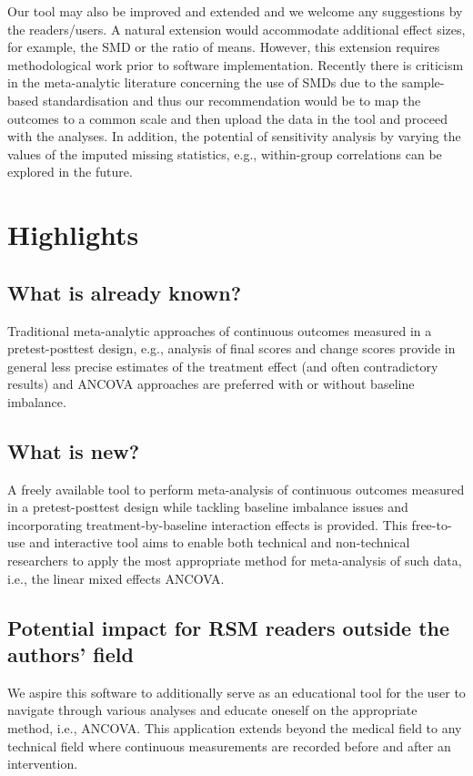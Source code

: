 \documentclass[AMA,STIX1COL]{WileyNJD-v2}
\begin{document}
Our tool may also be improved and extended and we welcome any suggestions by the readers/users. A natural extension would accommodate additional effect sizes, for example, the SMD or the ratio of means. However, this extension requires methodological work prior to software implementation. {\color{blue} Recently there is criticism in the meta-analytic literature concerning the use of SMDs due to the sample-based standardisation \cite{daly2021nice, cuijpers2017pre, kraft2020interpreting, cuijpers2021has} and thus our recommendation would be to map the outcomes to a common scale and then upload the data in the tool and proceed with the analyses.} In addition, the potential of sensitivity analysis by varying the values of the imputed missing statistics, e.g., within-group correlations can be explored in the future.


\section*{Highlights}
\subsection*{What is already known?}
Traditional meta-analytic approaches of continuous outcomes measured in a pretest-posttest design, e.g., analysis of final scores and change scores provide in general less precise estimates of the treatment effect (and often contradictory results) and ANCOVA approaches are preferred with or without baseline imbalance.

\subsection*{What is new?}
A freely available tool to perform meta-analysis of continuous outcomes measured in a pretest-posttest design while tackling baseline imbalance issues and incorporating treatment-by-baseline interaction effects is provided. This free-to-use and interactive tool aims to enable both technical and non-technical researchers to apply the most appropriate method for meta-analysis of such data, i.e., the linear mixed effects ANCOVA.

\subsection*{Potential impact for RSM readers outside the authors’ field}
We aspire this software to additionally serve as an educational tool for the user to navigate through various analyses and educate oneself on the appropriate method, i.e., ANCOVA. This application extends beyond the medical field to any technical field where continuous measurements are recorded before and after an intervention.
\end{document}
